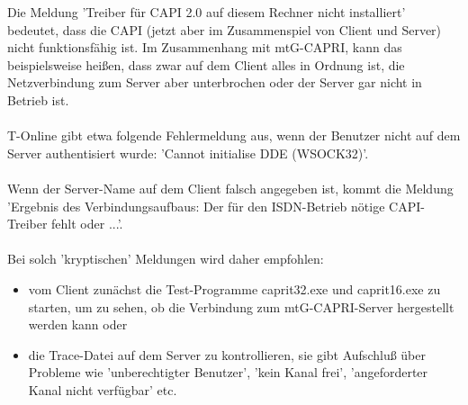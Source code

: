     Die Meldung 'Treiber für CAPI 2.0 auf diesem Rechner nicht installiert' bedeutet, dass
    die CAPI (jetzt aber im Zusammenspiel von Client und Server) nicht funktionsfähig ist.
    Im Zusammenhang mit mtG-CAPRI, kann das beispielsweise heißen, dass zwar auf dem Client alles in Ordnung ist,
    die Netzverbindung zum Server aber unterbrochen oder der Server gar nicht in Betrieb ist. \\
    \\
    T-Online gibt etwa folgende Fehlermeldung aus, wenn der Benutzer nicht auf dem Server authentisiert wurde:
    'Cannot initialise DDE (WSOCK32)'. \\
    \\
    Wenn der Server-Name auf dem Client falsch angegeben ist, kommt die Meldung 'Ergebnis des Verbindungsaufbaus:
    Der für den ISDN-Betrieb nötige CAPI-Treiber fehlt oder ...'. \\
    \\
    Bei solch 'kryptischen' Meldungen wird daher empfohlen:
    \begin{itemize}
        \item vom Client zunächst die Test-Programme caprit32.exe und caprit16.exe zu starten, um zu sehen, ob die Verbindung zum mtG-CAPRI-Server hergestellt werden kann oder
        \item die Trace-Datei auf dem Server zu kontrollieren, sie gibt Aufschluß über Probleme wie 'unberechtigter Benutzer', 'kein Kanal frei', 'angeforderter Kanal nicht verfügbar' etc.
    \end{itemize}

